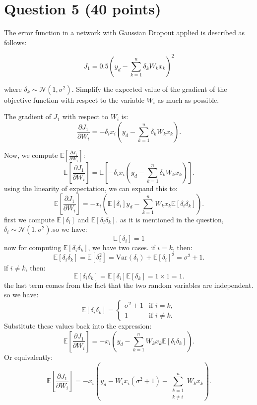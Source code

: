 \section{Question 5 (40 points)}
The error function in a network with Gaussian Dropout applied is described as follows:

\[
J_1 = 0.5 \left( y_d - \sum_{k=1}^n \delta_k W_k x_k \right)^2
\]

where \( \delta_k \sim \mathcal{N}(1, \sigma^2) \). Simplify the expected value of the gradient of the objective function with respect to the variable \( W_i \) as much as possible.
\begin{qsolve}
	\begin{qsolve}[]
		The gradient of \( J_1 \) with respect to \( W_i \) is:
		\[
		\frac{\partial J_1}{\partial W_i} = -\delta_i x_i \left( y_d - \sum_{k=1}^n \delta_k W_k x_k \right).
		\]

		Now, we compute \( \mathbb{E} \left[ \frac{\partial J_1}{\partial W_i} \right] \):
		\[
		\mathbb{E} \left[ \frac{\partial J_1}{\partial W_i} \right] = \mathbb{E} \left[ -\delta_i x_i \left( y_d - \sum_{k=1}^n \delta_k W_k x_k \right) \right].
		\]
		using the linearity of expectation, we can expand this to:
		\[
		\mathbb{E} \left[ \frac{\partial J_1}{\partial W_i} \right] = -x_i \left( \mathbb{E} \left[ \delta_i \right] y_d - \sum_{k=1}^n W_k x_k \mathbb{E} \left[ \delta_i \delta_k \right] \right).
		\]
		first we compute \( \mathbb{E} \left[ \delta_i \right] \) and \( \mathbb{E} \left[ \delta_i \delta_k \right] \). as it is mentioned in the question, \( \delta_i \sim \mathcal{N}(1, \sigma^2) \).so we have:
		\[
		\mathbb{E} \left[ \delta_i \right] = 1
		\]
		now for computing \( \mathbb{E} \left[ \delta_i \delta_k \right] \), we have two cases. if \( i = k \), then:
		\[
		\mathbb{E} \left[ \delta_i \delta_k \right] = \mathbb{E} \left[ \delta_i^2 \right] = \text{Var}(\delta_i) + \mathbb{E} \left[ \delta_i \right]^2 = \sigma^2 + 1.
		\]
		if \( i \neq k \), then:
		\[
		\mathbb{E} \left[ \delta_i \delta_k \right] = \mathbb{E} \left[ \delta_i \right] \mathbb{E} \left[ \delta_k \right] = 1 \times 1 = 1.
		\]
		the last term comes from the fact that the two random variables are independent.
		so we have:
		\[
		\mathbb{E} \left[ \delta_i \delta_k \right] = \begin{cases}
		\sigma^2 + 1 & \text{if } i = k, \\
		1 & \text{if } i \neq k.
		\end{cases}
		\]
		Substitute these values back into the expression:
		\splitqsolve[\splitqsolve]
		\[
		\mathbb{E} \left[ \frac{\partial J_1}{\partial W_i} \right] = -x_i \left( y_d - \sum_{k=1}^n W_k x_k \mathbb{E} \left[ \delta_i \delta_k \right] \right).
		\]
		Or equivalently:
		\[
		\mathbb{E} \left[ \frac{\partial J_1}{\partial W_i} \right] = -x_i \left( y_d - W_i x_i (\sigma^2 + 1) - \sum_{\substack{k=1 \\ k \neq i}}^n W_k x_k \right).
		\]
	\end{qsolve}
\end{qsolve}
